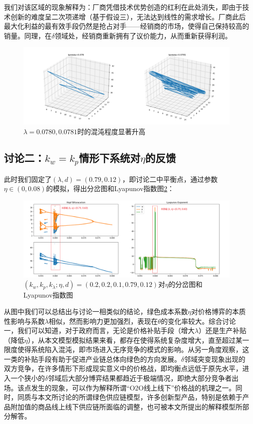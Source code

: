 \documentclass{article}
\begin{document}
\par 我们对该区域的现象解释为：厂商凭借技术优势创造的红利在此处消失，即由于技术创新的难度呈二次项递增（基于假设三），无法达到线性的需求增长。厂商此后最大化利益的最有效手段仍然是抢占对手——经销商的市场，使得自己保持较高的销量。同理，在$\delta$领域处，经销商重新拥有了议价能力，从而重新获得利润。
\begin{figure}[htp]
    \centering
    \includegraphics[width=16.5cm]{Hopf_Lyapunov_1_3.png}
    \caption{$\lambda=0.0780, 0.0781$时的混沌程度显著升高}
    \label{Hopf_Lyapunov_1_3}
\end{figure}
\subsection{讨论二：$k_w=k_p$情形下系统对$\eta$的反馈}
\par 此时我们固定了$(\lambda,d)=(0.79,0.12)$，即讨论二中平衡点，通过参数$\eta\in(0,0.08)$的模拟，得出分岔图和Lyapunov指数图\ref{Hopf_Lyapunov_2_1}：
\begin{figure}[htp]
    \centering
    \includegraphics[width=16.5cm]{Hopf_Lyapunov_2_1.png}
    \caption{$(k_w,k_p,k_\lambda;\eta,d)=(0.2,0.2,0.1,0.79,0.12)$对$\eta$的分岔图和Lyapunov指数图}
    \label{Hopf_Lyapunov_2_1}
\end{figure}
\par 从图中我们可以总结出与讨论一相类似的结论，绿色成本系数$\eta$对价格博弈的本质性影响与系数$\lambda$相似，然而影响力更加强烈，表现在$\theta$的变化率较大。综合讨论一，我们可以知道，对于政府而言，无论是价格补贴手段（增大$\lambda$）还是生产补贴（降低$\eta$），从本文模型模拟结果来看，都存在使得系统复杂度增大，直至超过某一限度使得系统陷入混沌，即市场进入无序竞争的模式的影响。从另一角度观察，这一类的补贴手段有助于促进产业链总体向绿色的方向发展。$\delta$邻域突变现象出现的双方竞争，在许多情形下形成现实意义中的价格战，即均衡点远低于原先水平，进入一个狭小的$\delta$邻域后大部分博弈结果都趋近于极端情况，即绝大部分竞争者出场。该点发生的现象，可以作为解释所谓“O2O线上线下”价格战的机理之一。同时，同质与本文所讨论的所谓绿色供应链模型，许多创新型产品，特别是依赖于产品附加值的商品线上线下供应链所面临的调整，也可被本文所提出的解释模型所部分解答。
\end{document}
